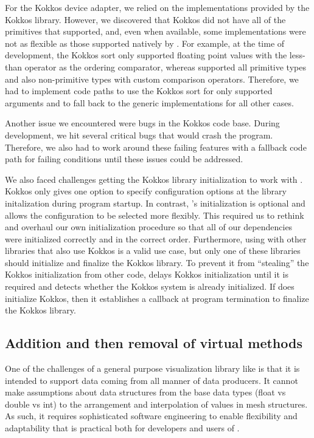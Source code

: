 For the Kokkos device adapter, we relied on the implementations provided by the Kokkos library.
However, we discovered that Kokkos did not have all of the primitives that \vtkm supported, and, even when available, some implementations were not as flexible as those supported natively by \vtkm.
For example, at the time of development, the Kokkos sort only supported floating point values with the less-than operator as the ordering comparator,
whereas \vtkm supported all primitive types and also non-primitive types with custom comparison operators.
Therefore, we had to implement code paths to use the Kokkos sort for only supported arguments and to fall back to the generic \vtkm implementations for all other cases.

Another issue we encountered were bugs in the Kokkos code base. During development, we hit several critical bugs that would crash the program. Therefore, we also had to work around these failing features with a fallback code path for failing conditions until these issues could be addressed.

We also faced challenges getting the Kokkos library initialization to work with \vtkm.
Kokkos only gives one option to specify configuration options at the library initalization during program startup.
In contrast, \vtkm's initialization is optional and allows the configuration to be selected more flexibly.
This required us to rethink and overhaul our own initialization procedure so that all of our dependencies were initialized correctly and in the correct order.
Furthermore, using \vtkm with other libraries that also use Kokkos is a valid use case, but only one of these libraries should initialize and finalize the Kokkos library.
To prevent it from ``stealing'' the Kokkos initialization from other code, \vtkm delays Kokkos initialization until it is required and detects whether the Kokkos system is already initialized.
If \vtkm does initialize Kokkos, then it establishes a callback at program termination to finalize the Kokkos library.

\subsection{Addition and then removal of virtual methods}
\label{sec:virtual-methods}


One of the challenges of a general purpose visualization library like \vtkm is that it is intended to support data coming from all manner of data producers.
It cannot make assumptions about data structures from the base data types (float vs double vs int) to the arrangement and interpolation of values in mesh structures.
As such, it requires sophisticated software engineering to enable flexibility and adaptability that is practical both for developers and users of \vtkm.

